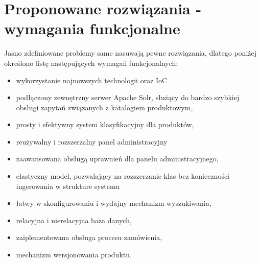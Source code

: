 \section{Proponowane rozwiązania - wymagania funkcjonalne}
Jasno zdefiniowane problemy same nasuwają pewne rozwiązania, dlatego poniżej określono listę następujących wymagań funkcjonalnych:
\begin{itemize}
	\item wykorzystanie najnowszych technologii oraz IoC
	\item podłączony zewnętrzny serwer Apache Solr, służący do bardzo szybkiej obsługi zapytań związanych z katalogiem produktowym,
	\item prosty i efektywny system klasyfikacyjny dla produktów,
	\item reużywalny i rozszerzalny panel administracyjny 
	\item zaawansowana obsługą uprawnień dla panelu administracyjnego,
	\item elastyczny model, pozwalający na rozszerzanie klas bez konieczności ingerowania w strukture systemu
	\item łatwy w skonfigurowaniu i wydajny mechanizm wyszukiwania,
	\item relacyjna i nierelacyjna baza danych,
	\item zaiplementowana obsługa procesu zamówienia,
	\item mechanizm wersjonowania produktu.
\end{itemize} 

